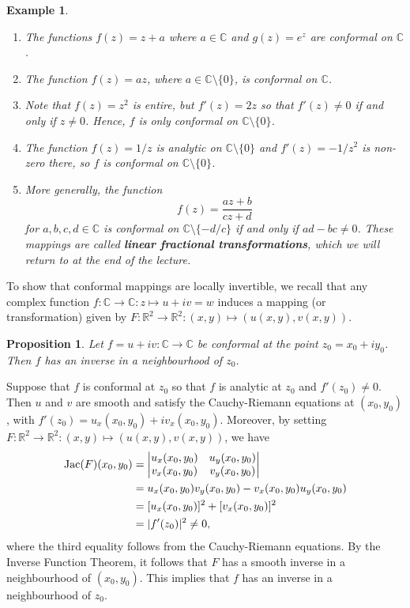 \documentclass[10pt]{article}
\makeatletter
\newcommand{\R}{\mathbb{R}}
\newcommand{\C}{\mathbb{C}}
\theoremstyle{newstyle}
\newtheorem{prop}[thm]{Proposition}
\newtheorem{exmp}[thm]{Example}
\newenvironment{pf}[1][\proofname]{\par
  \pushQED{\qed}%
  \normalfont \topsep0\p@\relax
  \trivlist
  \item[\hskip\labelsep\scshape
  #1\@addpunct{.}]\ignorespaces
}{%
  \popQED\endtrivlist\@endpefalse
}
\makeatother
\begin{document}
\begin{exmp}~
\begin{enumerate}[(1)]
    \item The functions $f(z) = z + a$ where $a \in \C$ and $g(z) = e^z$ are conformal on $\C$. 
    \item The function $f(z) = az$, where $a \in \C \setminus \{0\}$, is conformal on $\C$. 
    \item Note that $f(z) = z^2$ is entire, but $f'(z) = 2z$ so that $f'(z) \neq 0$ if and only if 
    $z \neq 0$. Hence, $f$ is only conformal on $\C \setminus \{0\}$. 
    \item The function $f(z) = 1/z$ is analytic on $\C \setminus \{0\}$ and 
    $f'(z) = -1/z^2$ is non-zero there, so $f$ is conformal on $\C \setminus \{0\}$. 
    \item More generally, the function 
    \[ f(z) = \frac{az+b}{cz+d} \]
    for $a, b, c, d \in \C$ is conformal on $\C \setminus \{-d/c\}$ if and only if 
    $ad - bc \neq 0$. These mappings are called {\bf linear fractional transformations}, 
    which we will return to at the end of the lecture. 
\end{enumerate}
\end{exmp}

To show that conformal mappings are locally invertible, we recall that any complex function 
$f : \C \to \C : z \mapsto u + iv = w$
induces a mapping (or transformation) given by 
$F : \R^2 \to \R^2 : (x, y) \mapsto (u(x, y), v(x, y))$.

\begin{prop}
Let $f = u+iv : \C \to \C$ be conformal at the point $z_0 = x_0 + iy_0$. Then $f$ has an 
inverse in a neighbourhood of $z_0$. 
\end{prop}
\begin{pf}
Suppose that $f$ is conformal at $z_0$ so that $f$ is analytic at $z_0$ and $f'(z_0) \neq 0$. 
Then $u$ and $v$ are smooth and satisfy the Cauchy-Riemann equations at $(x_0, y_0)$, with 
$f'(z_0) = u_x(x_0, y_0) + iv_x(x_0, y_0)$. Moreover, by setting 
$F : \R^2 \to \R^2 : (x, y) \mapsto (u(x, y), v(x, y))$, we have 
\begin{align*}
    {\rm Jac}(F)(x_0, y_0) &= \begin{vmatrix} u_x(x_0, y_0) & u_y(x_0, y_0) \\ v_x(x_0, y_0) & v_y(x_0, y_0) \end{vmatrix} \\ &= u_x(x_0, y_0)v_y(x_0, y_0) - v_x(x_0, y_0)u_y(x_0, y_0) \\
    &= [u_x(x_0, y_0)]^2 + [v_x(x_0, y_0)]^2 \\
    &= |f'(z_0)|^2 \neq 0,
\end{align*}
where the third equality follows from the Cauchy-Riemann equations. By the Inverse Function Theorem, 
it follows that $F$ has a smooth inverse in a neighbourhood of $(x_0, y_0)$. This implies that 
$f$ has an inverse in a neighbourhood of $z_0$. 
\end{pf}
\end{document}
